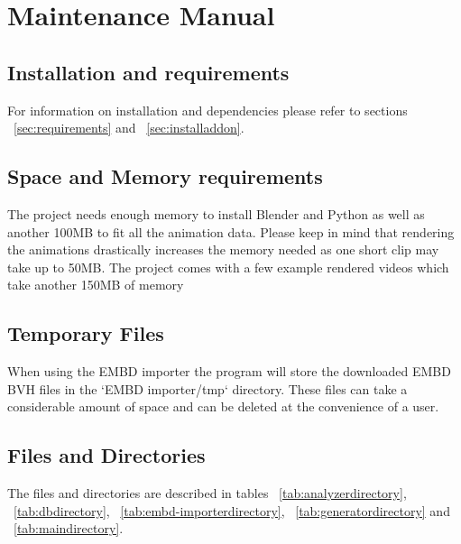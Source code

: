 \chapter{Maintenance Manual \label{chap:maintenance}}

\section{Installation and requirements}
For information on installation and dependencies please refer to sections ~\ref{sec:requirements} and ~\ref{sec:installaddon}.

\section{Space and Memory requirements}
The project needs enough memory to install Blender and Python as well as another 100MB to fit all the animation data. Please keep in mind that rendering the animations drastically increases the memory needed as one short clip may take up to 50MB. The project comes with a few example rendered videos which take another 150MB of memory

\section{Temporary Files}
When using the EMBD importer the program will store the downloaded EMBD BVH files in the `EMBD importer/tmp` directory. These files can take a considerable amount of space and can be deleted at the convenience of a user.

\section{Files and Directories}
The files and directories are described in tables ~\ref{tab:analyzerdirectory}, ~\ref{tab:dbdirectory}, ~\ref{tab:embd-importerdirectory}, ~\ref{tab:generatordirectory} and ~\ref{tab:maindirectory}.

